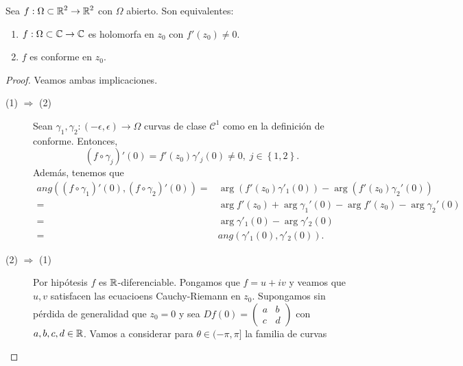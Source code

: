 \begin{theorem}
Sea $\displaystyle f: \Omega\subset \mathbb{R}^{2}\to \mathbb{R}^{2} $ con $\displaystyle \Omega  $ abierto. Son equivalentes:
\begin{enumerate}
\item $\displaystyle f : \Omega\subset \mathbb{C} \to \mathbb{C} $ es holomorfa en $\displaystyle z_{0} $ con $\displaystyle f'\left(z_{0}\right)\neq 0 $. 
\item $\displaystyle f $ es conforme en $\displaystyle z_{0} $.
\end{enumerate}
\end{theorem}
\begin{proof}
Veamos ambas implicaciones.
\begin{description}
\item[(1) $\displaystyle \Rightarrow $ (2)] Sean $\displaystyle \gamma_{1}, \gamma_{2} : \left(-\epsilon, \epsilon \right)\to \Omega  $ curvas de clase $\displaystyle \mathcal{C}^{1} $ como en la definición de conforme. Entonces,
	\[\left(f\circ \gamma_{j}\right)'\left(0\right)=f'\left(z_{0}\right)\gamma'_{j}\left(0\right)\neq 0, \; j \in \left\{ 1,2\right\}  .\]
Además, tenemos que
\[
\begin{split}
	ang\left(\left(f\circ\gamma_{1}\right)'\left(0\right), \left(f\circ\gamma_{2}\right)'\left(0\right)\right)= & \arg \left(f'\left(z_{0}\right)\gamma'_{1}\left(0\right)\right)-\arg \left(f'\left(z_{0}\right)\gamma_{2}'\left(0\right)\right)\\
	= & \arg f'\left(z_{0}\right) + \arg \gamma_{1}'\left(0\right)-\arg f'\left(z_{0}\right)-\arg \gamma_{2}'\left(0\right)\\
	= & \arg \gamma'_{1}\left(0\right)-\arg \gamma'_{2}\left(0\right) \\
	= & ang\left(\gamma'_{1}\left(0\right), \gamma'_{2}\left(0\right)\right).
\end{split}
\]
\item[(2) $\displaystyle \Rightarrow $ (1)] Por hipótesis $\displaystyle f $ es $\displaystyle \mathbb{R} $-diferenciable. Pongamos que $\displaystyle f = u + iv $ y veamos que $\displaystyle u,v $ satisfacen las ecuacioens Cauchy-Riemann en $\displaystyle z_{0}$. Supongamos sin pérdida de generalidad que $\displaystyle z_{0}=0 $ y sea $\displaystyle Df\left(0\right)=\begin{pmatrix} a & b \\ c & d \end{pmatrix} $ con $\displaystyle a,b,c,d \in \mathbb{R} $. 
	Vamos a considerar para $\displaystyle \theta \in (-\pi , \pi ] $ la familia de curvas

\end{description}
\end{proof}
